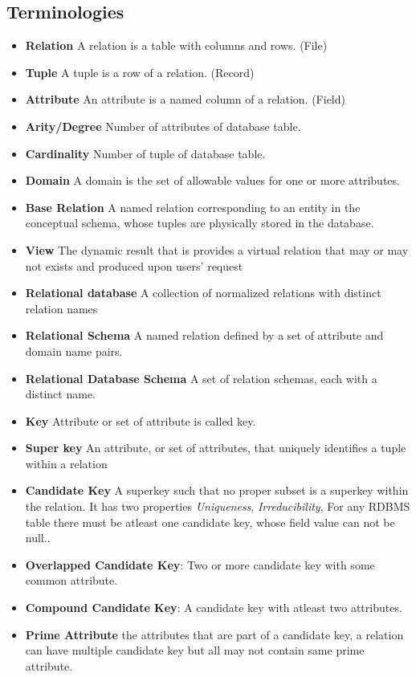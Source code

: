 \subsection{Terminologies}
\begin{itemize}
	\item \textbf{Relation} A relation is a table with columns and rows. (File)
	\item \textbf{Tuple} A tuple is a row of a relation. (Record)
	\item \textbf{Attribute} An attribute is a named column of a relation. (Field)
	\item \textbf{Arity/Degree} Number of attributes of database table.
	\item \textbf{Cardinality} Number of tuple of database table.
	\item \textbf{Domain} A domain is the set of allowable values for one or more attributes.
	\item \textbf{Base Relation} A named relation corresponding to an entity in the conceptual schema, whose tuples are physically stored in the database.
	\item \textbf{View} The dynamic result that is provides a virtual relation that may or may not exists and produced upon users' request
	\item \textbf{Relational database} A collection of normalized relations with distinct relation names
	\item \textbf{Relational Schema} A named relation defined by a set of attribute and domain name pairs.
	\item \textbf{Relational Database Schema} A set of relation schemas, each with a distinct name.
	\item \textbf{Key} Attribute or set of attribute is called key.
	\item \textbf{Super key} An attribute, or set of attributes, that uniquely identifies a tuple within a relation
	\item \textbf{Candidate Key} A superkey such that no proper subset is a superkey within the relation. It has two properties \textit{Uniqueness}, \textit{Irreducibility}, For any RDBMS table there must be atleast one candidate key, whose field value can not be null..
	\item \textbf{Overlapped Candidate Key}: Two or more candidate key with some common attribute.
	\item \textbf{Compound Candidate Key}: A candidate key with atleast two attributes.
	\item \textbf{Prime Attribute} the attributes that are part of a candidate key, a relation can have multiple candidate key but all may not contain same prime attribute.

\end{itemize}
